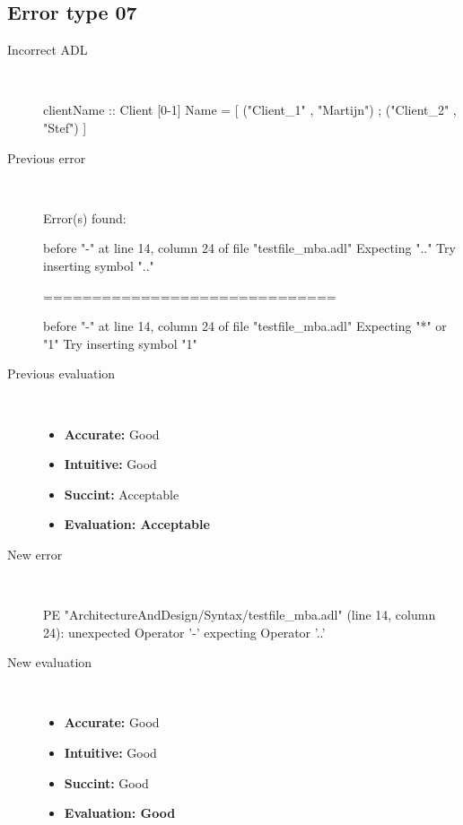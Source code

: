 \subsection{Error type 07}
  \begin{description}
  \item[Incorrect ADL]~\\
\begin{adl}
clientName :: Client [0-1] Name =
    [ ("Client_1"      , "Martijn")
    ; ("Client_2"      , "Stef")
    ]\end{adl}
  \item[Previous error]~\\
\begin{haskell}
Error(s) found:

before "-" at line 14, column 24 of file "testfile_mba.adl"
Expecting ".."
Try inserting symbol ".."

==============================

before "-" at line 14, column 24 of file "testfile_mba.adl"
Expecting "*" or "1"
Try inserting symbol "1"\end{haskell}
  \item[Previous evaluation]~\\
    \begin{itemize}
    \item \textbf{Accurate:} Good
    \item \textbf{Intuitive:} Good
    \item \textbf{Succint:} Acceptable
    \item \textbf{Evaluation: Acceptable}
    \end{itemize}
  \item[New error]~\\
\begin{haskell}
PE "ArchitectureAndDesign/Syntax/testfile_mba.adl" (line 14, column 24):
unexpected Operator '-'
expecting Operator '..'\end{haskell}
  \item[New evaluation]~\\
    \begin{itemize}
    \item \textbf{Accurate:} Good
    \item \textbf{Intuitive:} Good
    \item \textbf{Succint:} Good
    \item \textbf{Evaluation: Good
}
    \end{itemize}
  \end{description}

